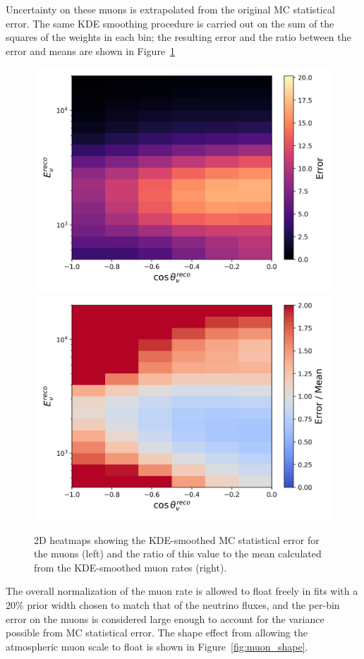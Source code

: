\documentclass[main.tex]{subfiles}
\begin{document}
Uncertainty on these muons is extrapolated from the original MC statistical error. 
The same KDE smoothing procedure is carried out on the sum of the squares of the weights in each bin; the resulting error and the ratio between the error and means are shown in Figure~\ref{fig:muonmuonerr}

\begin{figure}
    \centering
    \includegraphics[width=0.45\linewidth]{figures/kde_muons_error.png}%
    \includegraphics[width=0.45\linewidth]{figures/kde_muons_error_ratio.png}
    \caption{2D heatmaps showing the KDE-smoothed MC statistical error for the muons (left) and the ratio of this value to the mean calculated from the KDE-smoothed muon rates (right).}\label{fig:muonmuonerr}
\end{figure}

The overall normalization of the muon rate is allowed to float freely in fits with a 20\% prior width chosen to match that of the neutrino fluxes, and the per-bin error on the muons is considered large enough to account for the variance possible from MC statistical error.
The shape effect from allowing the atmospheric muon scale to float is shown in Figure~\ref{fig:muon_shape}.
\end{document}

